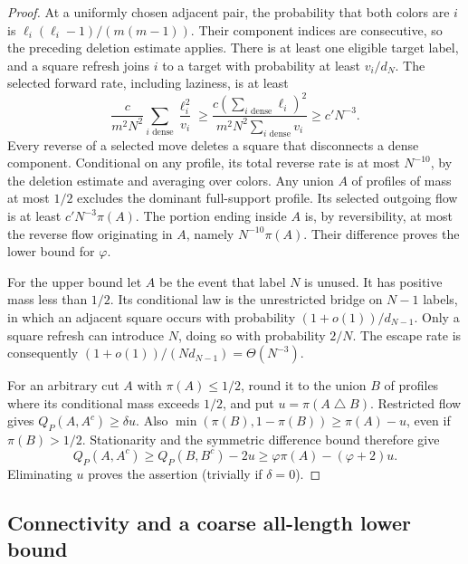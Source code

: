 \begin{proof}
At a uniformly chosen adjacent pair, the probability that both colors
are $i$ is $\ell_i(\ell_i-1)/(m(m-1))$.  Their component indices are
consecutive, so the preceding deletion estimate applies.  There is at
least one eligible target label, and a square refresh joins $i$ to a
target with probability at least $v_i/d_N$.  The selected forward rate,
including laziness, is at least
\[
 \frac{c}{m^2N^2}\sum_{i\text{ dense}}\frac{\ell_i^2}{v_i}
 \ge\frac{c(\sum_{i\text{ dense}}\ell_i)^2}
            {m^2N^2\sum_{i\text{ dense}}v_i}
 \ge c'N^{-3}.
\]
Every reverse of a selected move deletes a square that disconnects a
dense component.  Conditional on any profile, its total reverse rate
is at most $N^{-10}$, by the deletion estimate and averaging over colors.
Any union $A$ of profiles of mass at most $1/2$ excludes the dominant
full-support profile.  Its selected outgoing flow is at least
$c'N^{-3}\pi(A)$.  The portion ending inside $A$ is, by reversibility,
at most the reverse flow originating in $A$, namely $N^{-10}\pi(A)$.
Their difference proves the lower bound for $\varphi$.

For the upper bound let $A$ be the event that label $N$ is unused.
It has positive mass less than $1/2$.  Its conditional law is the
unrestricted bridge on $N-1$ labels, in which an adjacent square occurs
with probability $(1+o(1))/d_{N-1}$.  Only a square refresh can introduce
$N$, doing so with probability $2/N$.  The escape rate is consequently
$(1+o(1))/(N d_{N-1})=\Theta(N^{-3})$.

For an arbitrary cut $A$ with $\pi(A)\le1/2$, round it to the union $B$
of profiles where its conditional mass exceeds $1/2$, and put
$u=\pi(A\mathbin{\triangle} B)$.  Restricted flow gives
$Q_P(A,A^c)\ge\delta u$.
Also $\min(\pi(B),1-\pi(B))\ge\pi(A)-u$, even if $\pi(B)>1/2$.
Stationarity and the symmetric difference bound therefore give
\[
 Q_P(A,A^c)\ge Q_P(B,B^c)-2u
              \ge\varphi\pi(A)-(\varphi+2)u.
\]
Eliminating $u$ proves the assertion (trivially if $\delta=0$).
\end{proof}

\subsection{Connectivity and a coarse all-length lower bound}

